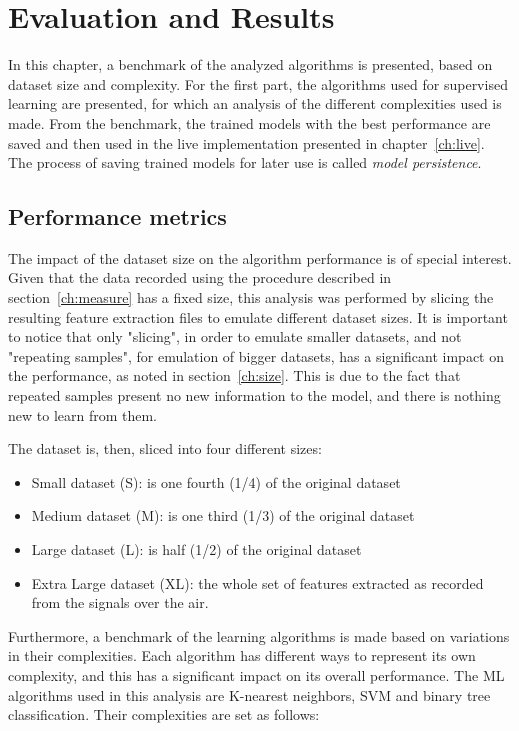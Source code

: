 \acresetall
\chapter{Evaluation and Results}\label{ch:evaluation}
In this chapter, a benchmark of the analyzed algorithms is presented, based on dataset size and complexity. For the first part, the algorithms used for supervised learning are presented, for which an analysis of the different complexities used is made. From the benchmark, the trained models with the best performance are saved and then used in the live implementation presented in chapter~\ref{ch:live}. The process of saving trained models for later use is called \emph{model persistence}.

\section{Performance metrics}\label{ch:performance}

The impact of the dataset size on the algorithm performance is of special interest. Given that the data recorded using the procedure described in section~\ref{ch:measure} has a fixed size, this analysis was performed by slicing the resulting feature extraction files to emulate different dataset sizes. It is important to notice that only "slicing", in order to emulate smaller datasets, and not "repeating samples", for emulation of bigger datasets, has a significant impact on the performance, as noted in section~\ref{ch:size}. This is due to the fact that repeated samples present no new information to the model, and there is nothing new to learn from them.

The dataset is, then, sliced into four different sizes:

\begin{itemize}
    \item Small dataset (S): is one fourth (1/4) of the original dataset
    \item Medium dataset (M): is one third (1/3) of the original dataset
    \item Large dataset (L): is half (1/2) of the original dataset
    \item Extra Large dataset (XL): the whole set of features extracted as recorded from the signals over the air.
\end{itemize}

Furthermore, a benchmark of the learning algorithms is made based on variations in their complexities. Each algorithm has different ways to represent its own complexity, and this has a significant impact on its overall performance. The \ac{ML} algorithms used in this analysis are K-nearest neighbors, \ac{SVM} and binary tree classification. Their complexities are set as follows:

